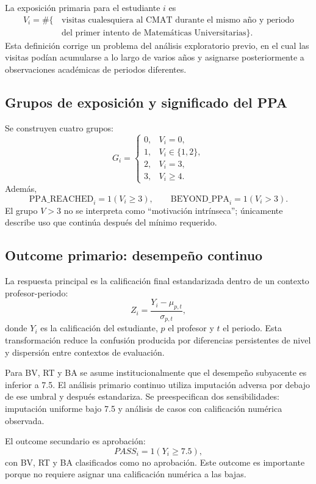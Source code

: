 \documentclass[11pt,letterpaper]{article}
\begin{document}
La exposición primaria para el estudiante $i$ es
\[
\begin{aligned}
V_i=\#\{\,&\text{visitas cualesquiera al CMAT durante el mismo año y periodo}\\
&\text{del primer intento de Matemáticas Universitarias}\}.
\end{aligned}
\]
Esta definición corrige un problema del análisis exploratorio previo, en el cual las visitas podían acumularse a lo largo de varios años y asignarse posteriormente a observaciones académicas de periodos diferentes.

\subsection{Grupos de exposición y significado del PPA}

Se construyen cuatro grupos:
\[
G_i=\begin{cases}
0, & V_i=0,\\
1, & V_i\in\{1,2\},\\
2, & V_i=3,\\
3, & V_i\geq4.
\end{cases}
\]
Además,
\[
\text{PPA\_REACHED}_i=1(V_i\geq3),\qquad
\text{BEYOND\_PPA}_i=1(V_i>3).
\]
El grupo $V>3$ no se interpreta como ``motivación intrínseca''; únicamente describe uso que continúa después del mínimo requerido.

\subsection{Outcome primario: desempeño continuo}

La respuesta principal es la calificación final estandarizada dentro de un contexto profesor-periodo:
\[
Z_i=\frac{Y_i-\mu_{p,t}}{\sigma_{p,t}},
\]
donde $Y_i$ es la calificación del estudiante, $p$ el profesor y $t$ el periodo. Esta transformación reduce la confusión producida por diferencias persistentes de nivel y dispersión entre contextos de evaluación.

Para BV, RT y BA se asume institucionalmente que el desempeño subyacente es inferior a 7.5. El análisis primario continuo utiliza imputación adversa por debajo de ese umbral y después estandariza. Se preespecifican dos sensibilidades: imputación uniforme bajo 7.5 y análisis de casos con calificación numérica observada.

El outcome secundario es aprobación:
\[
PASS_i=1(Y_i\geq7.5),
\]
con BV, RT y BA clasificados como no aprobación. Este outcome es importante porque no requiere asignar una calificación numérica a las bajas.
\end{document}
